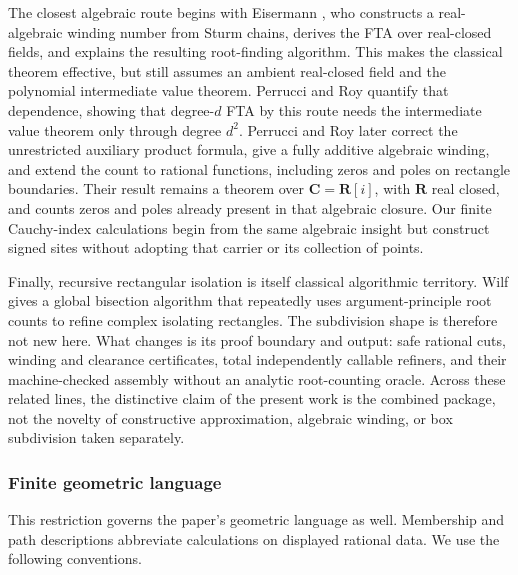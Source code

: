 \documentclass[11pt]{article}
\begin{document}
The closest algebraic route begins with Eisermann \cite{Eisermann}, who
constructs a real-algebraic winding number from Sturm chains, derives the FTA
over real-closed fields, and explains the resulting root-finding algorithm.
This makes the classical theorem effective, but still assumes an ambient
real-closed field and the polynomial intermediate value theorem.  Perrucci
and Roy \cite{PerrucciRoyQuantitative} quantify that dependence, showing that
degree-$d$ FTA by this route needs the intermediate value theorem only through
degree $d^2$.  Perrucci and Roy \cite{PerrucciRoyWinding} later correct the
unrestricted auxiliary product formula, give a fully additive algebraic
winding, and extend the count to rational functions, including zeros and
poles on rectangle boundaries.  Their result remains a
theorem over $\mathbf C=\mathbf R[i]$, with $\mathbf R$ real closed, and counts
zeros and poles already present in that algebraic closure.  Our finite
Cauchy-index calculations begin from the same algebraic insight but construct
signed sites without adopting that carrier or its collection of points.

Finally, recursive rectangular isolation is itself classical algorithmic
territory.  Wilf \cite{Wilf} gives a global bisection algorithm that repeatedly
uses argument-principle root counts to refine complex isolating rectangles.
The subdivision shape is therefore not new here.  What changes is its proof
boundary and output: safe rational cuts, winding and clearance certificates,
total independently callable refiners, and their machine-checked assembly
without an analytic root-counting oracle.  Across these related lines, the
distinctive claim of the present work is the combined package, not the
novelty of constructive approximation, algebraic winding, or box subdivision
taken separately.

\subsubsection{Finite geometric language}

This restriction governs the paper's geometric language as well.  Membership
and path descriptions abbreviate calculations on displayed rational data.
We use the following conventions.
\end{document}
